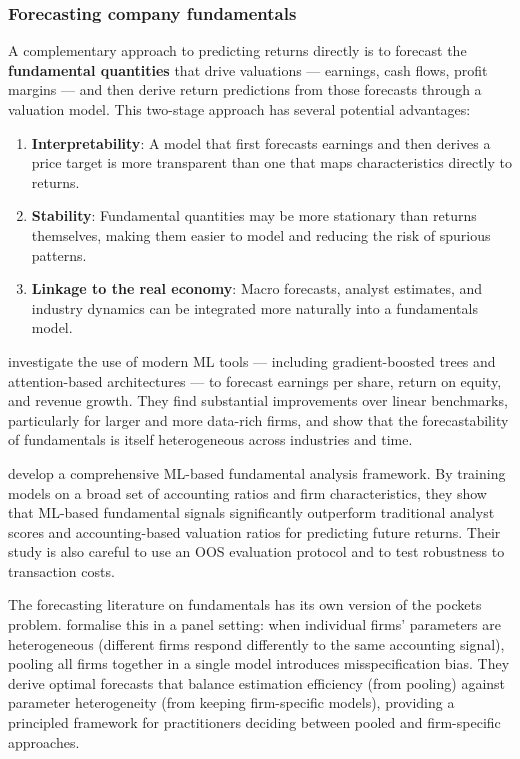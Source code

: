 \subsubsection{Forecasting company fundamentals}\label{sec_pred_fundamentals}

A complementary approach to predicting returns directly is to forecast the \textbf{fundamental quantities} that drive valuations --- earnings, cash flows, profit margins --- and then derive return predictions from those forecasts through a valuation model. This two-stage approach has several potential advantages:

\begin{enumerate}
\item \textbf{Interpretability}: A model that first forecasts earnings and then derives a price target is more transparent than one that maps characteristics directly to returns.
\item \textbf{Stability}: Fundamental quantities may be more stationary than returns themselves, making them easier to model and reducing the risk of spurious patterns.
\item \textbf{Linkage to the real economy}: Macro forecasts, analyst estimates, and industry dynamics can be integrated more naturally into a fundamentals model.
\end{enumerate}

\cite{divo2025forecasting} investigate the use of modern ML tools --- including gradient-boosted trees and attention-based architectures --- to forecast earnings per share, return on equity, and revenue growth. They find substantial improvements over linear benchmarks, particularly for larger and more data-rich firms, and show that the forecastability of fundamentals is itself heterogeneous across industries and time.

\cite{cao2024fundamental} develop a comprehensive ML-based fundamental analysis framework. By training models on a broad set of accounting ratios and firm characteristics, they show that ML-based fundamental signals significantly outperform traditional analyst scores and accounting-based valuation ratios for predicting future returns. Their study is also careful to use an OOS evaluation protocol and to test robustness to transaction costs.

The forecasting literature on fundamentals has its own version of the pockets problem. \cite{pesaran2024forecasting} formalise this in a panel setting: when individual firms' parameters are heterogeneous (different firms respond differently to the same accounting signal), pooling all firms together in a single model introduces misspecification bias. They derive optimal forecasts that balance estimation efficiency (from pooling) against parameter heterogeneity (from keeping firm-specific models), providing a principled framework for practitioners deciding between pooled and firm-specific approaches.

